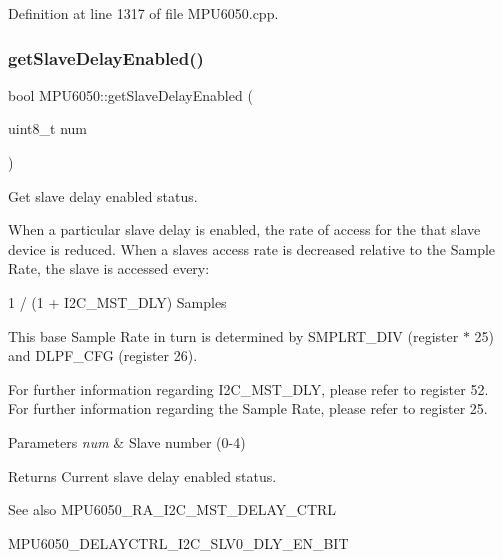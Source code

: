 Definition at line 1317 of file M\+P\+U6050.\+cpp.

\mbox{\label{classMPU6050_ae84fd795630f9ab5e8d6b19a616a11ce}} 
\subsubsection{\texorpdfstring{getSlaveDelayEnabled()}{getSlaveDelayEnabled()}}
{\footnotesize\ttfamily bool M\+P\+U6050\+::get\+Slave\+Delay\+Enabled (\begin{DoxyParamCaption}\item[{uint8\+\_\+t}]{num }\end{DoxyParamCaption})}



Get slave delay enabled status. 

When a particular slave delay is enabled, the rate of access for the that slave device is reduced. When a slave\textquotesingle{}s access rate is decreased relative to the Sample Rate, the slave is accessed every\+: \begin{DoxyVerb}1 / (1 + I2C_MST_DLY) Samples
\end{DoxyVerb}


This base Sample Rate in turn is determined by S\+M\+P\+L\+R\+T\+\_\+\+D\+IV (register $\ast$ 25) and D\+L\+P\+F\+\_\+\+C\+FG (register 26).

For further information regarding I2\+C\+\_\+\+M\+S\+T\+\_\+\+D\+LY, please refer to register 52. For further information regarding the Sample Rate, please refer to register 25.


\begin{DoxyParams}{Parameters}
{\em num} & Slave number (0-\/4) \\
\hline
\end{DoxyParams}
\begin{DoxyReturn}{Returns}
Current slave delay enabled status. 
\end{DoxyReturn}
\begin{DoxySeeAlso}{See also}
M\+P\+U6050\+\_\+\+R\+A\+\_\+\+I2\+C\+\_\+\+M\+S\+T\+\_\+\+D\+E\+L\+A\+Y\+\_\+\+C\+T\+RL 

M\+P\+U6050\+\_\+\+D\+E\+L\+A\+Y\+C\+T\+R\+L\+\_\+\+I2\+C\+\_\+\+S\+L\+V0\+\_\+\+D\+L\+Y\+\_\+\+E\+N\+\_\+\+B\+IT 
\end{DoxySeeAlso}



